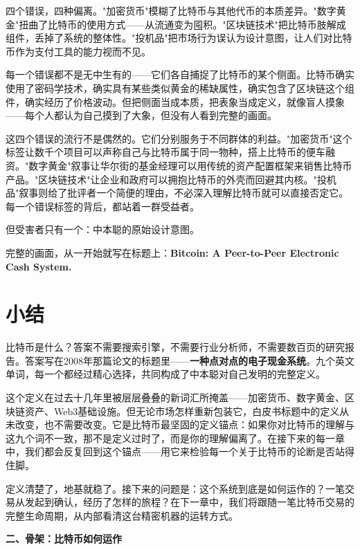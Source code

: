 \documentclass[a4paper,12pt,openany]{ctexbook}
\begin{document}
四个错误，四种偏离。"加密货币"模糊了比特币与其他代币的本质差异。"数字黄金"扭曲了比特币的使用方式——从流通变为囤积。"区块链技术"把比特币肢解成组件，丢掉了系统的整体性。"投机品"把市场行为误认为设计意图，让人们对比特币作为支付工具的能力视而不见。

每一个错误都不是无中生有的——它们各自捕捉了比特币的某个侧面。比特币确实使用了密码学技术，确实具有某些类似黄金的稀缺属性，确实包含了区块链这个组件，确实经历了价格波动。但把侧面当成本质，把表象当成定义，就像盲人摸象——每个人都认为自己摸到了大象，但没有人看到完整的画面。

这四个错误的流行不是偶然的。它们分别服务于不同群体的利益。"加密货币"这个标签让数千个项目可以声称自己与比特币属于同一物种，搭上比特币的便车融资。"数字黄金"叙事让华尔街的基金经理可以用传统的资产配置框架来销售比特币产品。"区块链技术"让企业和政府可以拥抱比特币的外壳而回避其内核。"投机品"叙事则给了批评者一个简便的理由，不必深入理解比特币就可以直接否定它。每一个错误标签的背后，都站着一群受益者。

但受害者只有一个：中本聪的原始设计意图。

完整的画面，从一开始就写在标题上：\textbf{Bitcoin: A Peer-to-Peer Electronic Cash System.}


\section*{小结}


比特币是什么？答案不需要搜索引擎，不需要行业分析师，不需要数百页的研究报告。答案写在2008年那篇论文的标题里——\textbf{一种点对点的电子现金系统}。九个英文单词，每一个都经过精心选择，共同构成了中本聪对自己发明的完整定义。

这个定义在过去十几年里被层层叠叠的新词汇所掩盖——加密货币、数字黄金、区块链资产、Web3基础设施。但无论市场怎样重新包装它，白皮书标题中的定义从未改变，也不需要改变。它是比特币最坚固的定义锚点：如果你对比特币的理解与这九个词不一致，那不是定义过时了，而是你的理解偏离了。在接下来的每一章中，我们都会反复回到这个锚点——用它来检验每一个关于比特币的论断是否站得住脚。

定义清楚了，地基就稳了。接下来的问题是：这个系统到底是如何运作的？一笔交易从发起到确认，经历了怎样的旅程？在下一章中，我们将跟随一笔比特币交易的完整生命周期，从内部看清这台精密机器的运转方式。




\vspace{2em}
\begin{center}
{\Large\bfseries 二、骨架：比特币如何运作}
\end{center}
\vspace{1em}
\end{document}
